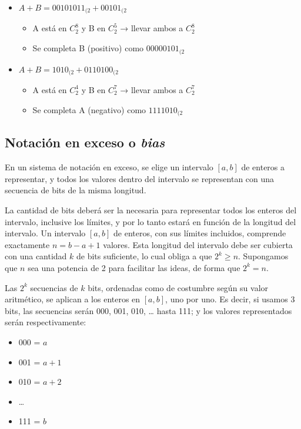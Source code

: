 \documentclass[spanish,A4,]{article}
\begin{document}
\begin{itemize}
\itemsep1pt\parskip0pt
\item
  $A + B = 00101011_{(2} + 00101_{(2}$

  \begin{itemize}
  \itemsep1pt\parskip0pt
  \item
    A está en $C^8_2$ y B en $C^5_2$ → llevar ambos a $C^8_2$
  \item
    Se completa B (positivo) como $00000101_{(2}$
  \end{itemize}
\item
  $A + B = 1010_{(2} + 0110100_{(2}$

  \begin{itemize}
  \itemsep1pt\parskip0pt
  \item
    A está en $C^4_2$ y B en $C^7_2$ → llevar ambos a $C^7_2$
  \item
    Se completa A (negativo) como $1111010_{(2}$
  \end{itemize}
\end{itemize}

\subsection{Notación en exceso o
\emph{bias}}\label{notaciuxf3n-en-exceso-o-bias}

En un sistema de notación en exceso, se elige un intervalo $[a, b]$ de
enteros a representar, y todos los valores dentro del intervalo se
representan con una secuencia de bits de la misma longitud.

La cantidad de bits deberá ser la necesaria para representar todos los
enteros del intervalo, inclusive los límites, y por lo tanto estará en
función de la longitud del intervalo. Un intervalo $[a, b]$ de enteros,
con sus límites incluidos, comprende exactamente $n = b - a + 1$
valores. Esta longitud del intervalo debe ser cubierta con una cantidad
$k$ de bits suficiente, lo cual obliga a que $2^k \geq n$. Supongamos
que $n$ sea una potencia de 2 para facilitar las ideas, de forma que
$2^k = n$.

Las $2^k$ secuencias de $k$ bits, ordenadas como de costumbre según su
valor aritmético, se aplican a los enteros en $[a, b]$, uno por uno. Es
decir, si usamos 3 bits, las secuencias serán 000, 001, 010, \ldots{}
hasta 111; y los valores representados serán respectivamente:

\begin{itemize}
\itemsep1pt\parskip0pt
\item
  000 = $a$
\item
  001 = $a + 1$
\item
  010 = $a + 2$
\item
  \ldots{}
\item
  111 = $b$
\end{itemize}
\end{document}

